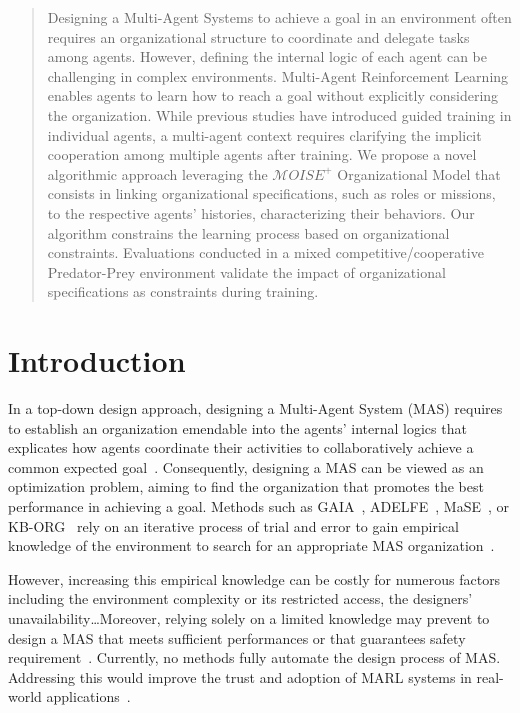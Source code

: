 \documentclass[runningheads]{llncs}
\theoremstyle{freethm}
\theoremstyle{proofoutline}
\begin{document}
\begin{abstract}

    Designing a Multi-Agent Systems to achieve a goal in an environment often requires an organizational structure to coordinate and delegate tasks among agents. However, defining the internal logic of each agent can be challenging in complex environments. Multi-Agent Reinforcement Learning enables agents to learn how to reach a goal without explicitly considering the organization.
    While previous studies have introduced guided training in individual agents, a multi-agent context requires clarifying the implicit cooperation among multiple agents after training. We propose a novel algorithmic approach leveraging the $\mathcal{M}OISE^+$ Organizational Model that consists in linking organizational specifications, such as roles or missions, to the respective agents' histories, characterizing their behaviors. Our algorithm constrains the learning process based on organizational constraints. Evaluations conducted in a mixed competitive/cooperative Predator-Prey environment validate the impact of organizational specifications as constraints during training.

\end{abstract}


\section{Introduction}

In a top-down design approach, designing a Multi-Agent System (MAS) requires to establish an organization emendable into the agents' internal logics that explicates how agents coordinate their activities to collaboratively achieve a common expected goal~\cite{Picard2009}.
%
Consequently, designing a MAS can be viewed as an optimization problem, aiming to find the organization that promotes the best performance in achieving a goal. Methods such as GAIA~\cite{Wooldridge2000,Cernuzzi2014}, ADELFE~\cite{Mefteh2015}, MaSE~\cite{Deloach2001}, or KB-ORG~\cite{Sims2008} rely on an iterative process of trial and error to gain empirical knowledge of the environment to search for an appropriate MAS organization~\cite{Sims2008}.

However, increasing this empirical knowledge can be costly for numerous factors including the environment complexity or its restricted access, the designers' unavailability\dots Moreover, relying solely on a limited knowledge may prevent to design a MAS that meets sufficient performances or that guarantees safety requirement~\cite{Mefteh2013}. Currently, no methods fully automate the design process of MAS. Addressing this would improve the trust and adoption of MARL systems in real-world applications~\cite{kok2006collaborative,omidshafiei2019learning}.
\end{document}
